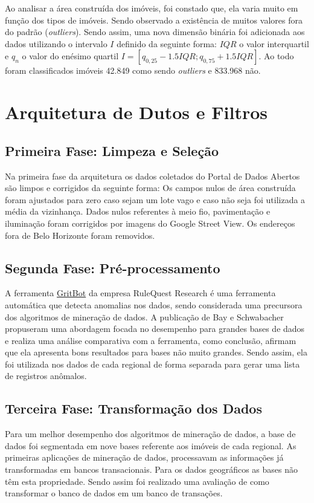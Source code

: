 \documentclass[12pt]{article}
\begin{document}
Ao analisar a área construída dos imóveis, foi constado que, ela varia muito em função dos tipos de imóveis. Sendo observado a existência de muitos valores fora do padrão (\textit{outliers}). Sendo assim, uma nova dimensão binária foi adicionada aos dados utilizando o intervalo $I$ definido da seguinte forma: $IQR$ o valor interquartil e $q_n$ o valor do enésimo quartil $I = \left[ q_{0,25} - 1.5IQR;q_{0,75} + 1.5IQR  \right]$. Ao todo foram classificados imóveis 42.849 como sendo \textit{outliers} e 833.968 não. 

\section{Arquitetura de Dutos e Filtros}

\subsection{Primeira Fase: Limpeza e Seleção}

Na primeira fase da arquitetura os dados coletados do Portal de Dados Abertos são limpos e corrigidos da seguinte forma: Os campos nulos de área construída foram ajustados para zero caso sejam um lote vago e caso não seja foi utilizada a média da vizinhança. Dados nulos referentes à meio fio, pavimentação e iluminação foram corrigidos por imagens do Google Street View\textregistered. Os endereços fora de Belo Horizonte foram removidos.

\subsection{Segunda Fase: Pré-processamento}

A ferramenta \href{https://www.rulequest.com/gritbot-info.html}{GritBot} da empresa RuleQuest Research é uma ferramenta automática que detecta anomalias nos dados, sendo considerada uma precursora dos algoritmos de mineração de dados. A publicação de Bay e Schwabacher \cite{bay2003mining} propuseram uma abordagem focada no desempenho para grandes bases de dados e realiza uma análise comparativa com a ferramenta, como conclusão, afirmam que ela apresenta bons resultados para bases não muito grandes. Sendo assim, ela foi utilizada nos dados de cada regional de forma separada para gerar uma lista de registros anômalos. 

\subsection{Terceira Fase: Transformação dos Dados}
Para um melhor desempenho dos algoritmos de mineração de dados, a base de dados foi segmentada em nove bases referente aos imóveis de cada regional. As primeiras aplicações de mineração de dados, processavam as informações já transformadas em bancos transacionais. Para os dados geográficos as bases não têm esta propriedade. Sendo assim foi realizado uma avaliação de como transformar o banco de dados em um banco de transações.
\end{document}
